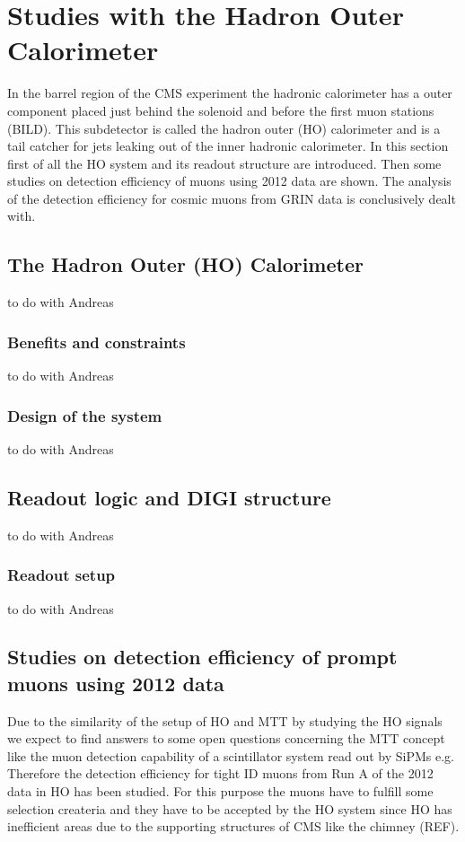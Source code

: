 \section{Studies with the Hadron Outer Calorimeter}
In the barrel region of the CMS experiment the hadronic calorimeter has a outer component placed just behind the solenoid and before the first muon stations (BILD). 
This subdetector is called the hadron outer (HO) calorimeter and is a tail catcher for jets leaking out of the inner hadronic calorimeter.
In this section first of all the HO system and its readout structure are introduced.
Then some studies on detection efficiency of muons using 2012 data are shown. The analysis of the detection efficiency for cosmic muons from GRIN data is conclusively dealt with.
	\subsection{The Hadron Outer (HO) Calorimeter}
		to do with Andreas
  		\subsubsection{Benefits and constraints}
			to do with Andreas
  		\subsubsection{Design of the system}
			to do with Andreas
	\subsection{Readout logic and DIGI structure}
		to do with Andreas
  		\subsubsection{Readout setup}
			to do with Andreas
	\subsection{Studies on detection efficiency of prompt muons using 2012 data}
		Due to the similarity of the setup of HO and MTT by studying the HO signals we expect to find answers to some open questions concerning the MTT concept like the muon detection capability of a
		scintillator system  read out by SiPMs e.g. Therefore the detection efficiency for tight ID muons from Run A of the 2012 data in HO has been studied.
		For this purpose the muons have to fulfill some selection createria and they have to be accepted by the HO system since HO has inefficient areas due to the supporting structures of CMS like the
		chimney (REF).
